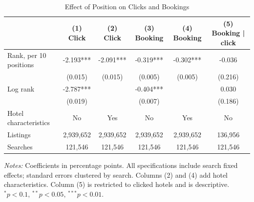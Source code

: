 \begin{table}[htbp]\centering
\caption{Effect of Position on Clicks and Bookings}\label{tab:position}
\begin{tabular}{lccccc}
\toprule
 & (1) Click & (2) Click & (3) Booking & (4) Booking & (5) Booking | click \\
\midrule
Rank, per 10 positions & -2.193*** & -2.091*** & -0.319*** & -0.302*** & -0.036 \\
 & (0.015) & (0.015) & (0.005) & (0.005) & (0.216) \\
Log rank & -2.787*** &  & -0.404*** &  & 0.030 \\
 & (0.019) &  & (0.007) &  & (0.186) \\
\midrule
Hotel characteristics & No & Yes & No & Yes & No \\
Listings & 2,939,652 & 2,939,652 & 2,939,652 & 2,939,652 & 136,956 \\
Searches & 121,546 & 121,546 & 121,546 & 121,546 & 121,546 \\
\bottomrule
\end{tabular}
\begin{minipage}{0.92\textwidth}\footnotesize
\vspace{0.3em}\textit{Notes:} Coefficients in percentage points. All specifications include search fixed effects; standard errors clustered by search. Columns (2) and (4) add hotel characteristics. Column (5) is restricted to clicked hotels and is descriptive. $^{*}p<0.1$, $^{**}p<0.05$, $^{***}p<0.01$.
\end{minipage}
\end{table}
